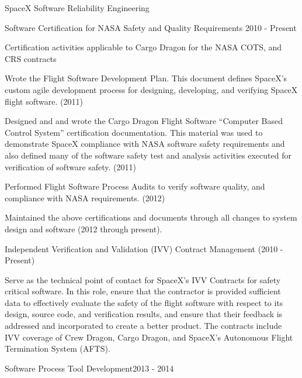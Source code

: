 \documentclass{resume} %
\begin{document}
\begin{rSection}{SpaceX Software Reliability Engineering}

\begin{rSubsection}{Software Certification for NASA Safety and Quality Requirements} {2010 - Present}{}{}

Certification activities applicable to Cargo Dragon for the NASA COTS,
and CRS contracts

\item Wrote the Flight Software Development Plan. This document defines SpaceX's
  custom agile development process for designing, developing, and verifying
  SpaceX flight software. (2011)
\item Designed and and wrote the Cargo Dragon Flight Software ``Computer Based
  Control System'' certification documentation. This material was used to
  demonstrate SpaceX compliance with NASA software safety requirements and also
  defined many of the software safety test and analysis activities executed for
  verification of software safety. (2011)
\item Performed Flight Software Process Audits to verify software quality, and
  compliance with NASA requirements. (2012)
\item Maintained the above certifications and documents through all changes to
  system design and software (2012 through present).

\end{rSubsection}

\begin{rSubsection}{Independent Verification and Validation (IVV) Contract Management (2010 - Present)}{}{}

\item Serve as the technical point of contact for SpaceX's IVV Contracts for
  safety critical software. In this role, ensure that the contractor is provided
  sufficient data to effectively evaluate the safety of the flight software with
  respect to its design, source code, and verification results, and ensure that
  their feedback is addressed and incorporated to create a better product. The
  contracts include IVV coverage of Crew Dragon, Cargo Dragon, and SpaceX's
  Autonomous Flight Termination System (AFTS).

\end{rSubsection}


\begin{rSubsection}{Software Process Tool Development}{2013 - 2014}{}{}


\end{rSubsection}
\end{rSection}
\end{document}
